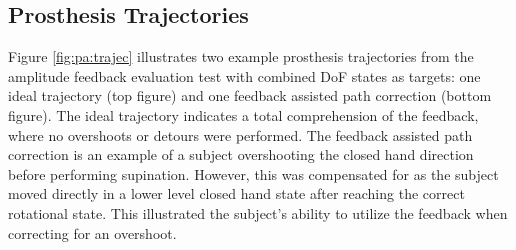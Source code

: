 
\subsection{Prosthesis Trajectories}

Figure \ref{fig:pa:trajec} illustrates two example prosthesis trajectories from the amplitude feedback evaluation test with combined DoF states as targets: one ideal trajectory (top figure) and one feedback assisted path correction (bottom figure). The ideal trajectory indicates a total comprehension of the feedback, where no overshoots or detours were performed. The feedback assisted path correction is an example of a subject overshooting the closed hand direction before performing supination. However, this was compensated for as the subject moved directly in a lower level closed hand state after reaching the correct rotational state. This illustrated the subject's ability to utilize the feedback when correcting for an overshoot. 

